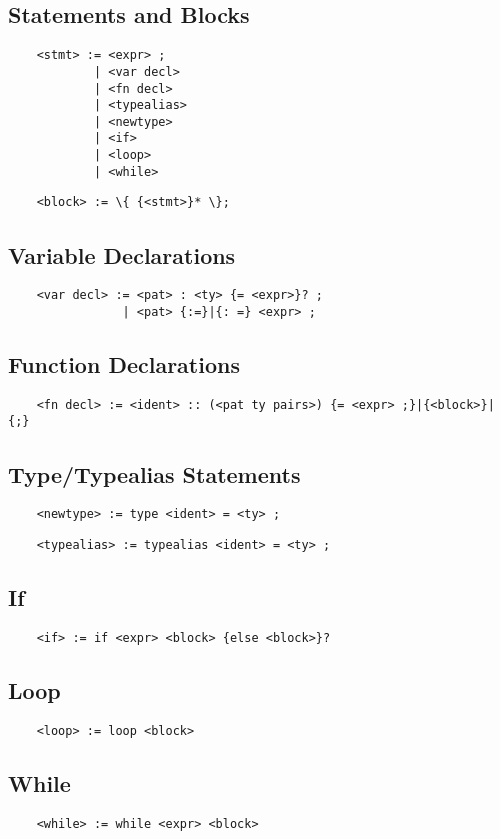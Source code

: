 \documentclass[a4paper]{article}
\begin{document}
\subsection{Statements and Blocks}

\begin{verbatim}
    <stmt> := <expr> ;
            | <var decl>
            | <fn decl>
            | <typealias>
            | <newtype>
            | <if>
            | <loop>
            | <while>
\end{verbatim}

\begin{verbatim}
    <block> := \{ {<stmt>}* \};
\end{verbatim}

\subsection{Variable Declarations}

\begin{verbatim}
    <var decl> := <pat> : <ty> {= <expr>}? ;
                | <pat> {:=}|{: =} <expr> ;
\end{verbatim}

\subsection{Function Declarations}

\begin{verbatim}
    <fn decl> := <ident> :: (<pat ty pairs>) {= <expr> ;}|{<block>}|{;}
\end{verbatim}

\subsection{Type/Typealias Statements}

\begin{verbatim}
    <newtype> := type <ident> = <ty> ;
\end{verbatim}

\begin{verbatim}
    <typealias> := typealias <ident> = <ty> ;
\end{verbatim}

\subsection{If}

\begin{verbatim}
    <if> := if <expr> <block> {else <block>}?
\end{verbatim}

\subsection{Loop}

\begin{verbatim}
    <loop> := loop <block>
\end{verbatim}

\subsection{While}

\begin{verbatim}
    <while> := while <expr> <block>
\end{verbatim}
\end{document}
